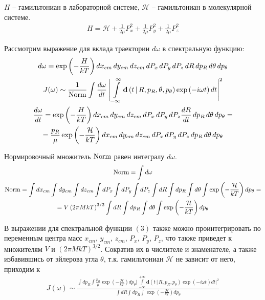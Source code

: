 \documentclass[14pt]{extarticle}
\newcommand{\lb}{\left(}
\newcommand{\rb}{\right)}
\newcommand{\tp}{\textup}
\newcommand{\mH}{\mathcal{H}}
\newcommand{\dv}{\mathbf{d}}
\begin{document}
$H$ -- гамильтониан в лабораторной системе, $\mH$ -- гамильтониан в молекулярной системе.
\begin{gather}
	H = \mH + \frac{1}{2 \mu} P_x^2 + \frac{1}{2 \mu} P_y^2 + \frac{1}{2 \mu} P_z^2
\end{gather}

Рассмотрим выражение для вклада траектории $d \omega$ в спектральную функцию: 
\begin{gather}
		d \omega = \exp \lb - \frac{H}{k T} \rb dx_{cm} \, dy_{cm} \, dz_{cm} \, d P_x \, dP_y \, dP_z \, d R \, d p_R \, d \theta \, d p_\theta \\
J( \omega ) \sim \frac{1}{\tp{Norm}} \int \frac{d \omega}{d t} \, \Biggl \rvert \, \int\limits_{-\infty}^{\infty} \dv \lb t \, | \, R, p_R, \theta, p_\theta \rb \exp \lb - i \omega t \rb dt \Biggr \rvert^2 \\
	\frac{d \omega}{d t} = \exp \lb - \frac{H}{k T} \rb d x_{cm} \, d y_{cm} \, d z_{cm} \, dP_x \, dP_y \, dP_z \frac{d R}{d t} \, d p_R \, d \theta \, d p_\theta = \\ 
	= \frac{p_R}{\mu} \exp \lb - \frac{\mH}{kT} \rb d x_{cm} \, dy_{cm} \, dz_{cm} \, dP_x \, dP_y \, dP_z \, d p_R \, d \theta \, d p_\theta
\end{gather}

Нормировочный множитель $\tp{Norm}$ равен интегралу $d \omega$. 
\begin{gather}
	\tp{Norm} = \int d \omega \\ 
	\tp{Norm} = \int dx_{cm} \int dy_{cm} \int dz_{cm} \int dP_x \int dP_y \int dP_z \int d R \int d p_R \int d \theta \int \exp \lb - \frac{\mH}{k T} \rb d p_\theta = \notag \\
	= V \lb 2 \pi M k T \rb^{3/2} \int dR \int dp_R \int d\theta \int \exp \lb - \frac{\mH}{kT} \rb d p_\theta
\end{gather}

В выражении для спектральной функции $(3)$ также можно проинтегрировать по переменным центра масс $x_{cm}$, $y_{cm}$, $z_{cm}$, $P_x$, $P_y$, $P_z$, что также приведет к множителям $V$ и $\lb 2 \pi M k T \rb^{3/2}$. Сократив их в числителе и знаменателе, а также избавившись от эйлерова угла $\theta$, т.к. гамильтониан $\mH$ не зависит от него, приходим к
\begin{gather}
	J( \omega ) \sim \frac{ \displaystyle \int dp_R \int \frac{p_R}{\mu} \exp \lb - \frac{\mH}{k T} \rb d p_\theta \Biggl \rvert \, \int\limits_{-\infty}^{+\infty} \dv \lb t \, | \, R, p_R, p_\theta \rb \exp \lb -i \omega t \rb dt \Biggr \rvert^2 }
	{\displaystyle \int dR \int dp_R  \int \exp \lb -\frac{\mH}{kT} \rb d p_\theta } 
\end{gather}
\end{document}
